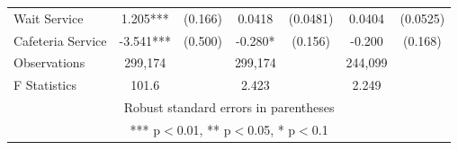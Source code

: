 \begin{tabular}{lcccccc}
Wait Service & 1.205*** & (0.166) & 0.0418 & (0.0481) & 0.0404 & (0.0525) \\
Cafeteria Service & -3.541*** & (0.500) & -0.280* & (0.156) & -0.200 & (0.168) \\
Observations & 299,174 &  & 299,174 &  & 244,099 &  \\
 F Statistics & 101.6 &  & 2.423 &  & 2.249 &  \\ \hline
\multicolumn{7}{c}{ Robust standard errors in parentheses} \\
\multicolumn{7}{c}{ *** p$<$0.01, ** p$<$0.05, * p$<$0.1} \\
\end{tabular}
